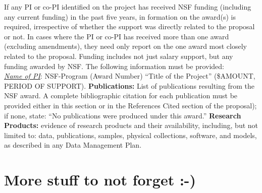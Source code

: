 If any PI or co-PI identified on the project has received NSF funding (including any current
funding) in the past five years, in formation on the award(s) is required,
irrespective of whether the support was directly related to the proposal or not.
In cases where the PI or co-PI has received more than one award (excluding amendments),
they need only report on the one award most closely related to the proposal. Funding includes not just salary
support, but any funding awarded by NSF. The following information must be provided:\\

\noindent
\emph{\underline{Name of PI}}: NSF-Program (Award Number) ``Title of the Project'' (\$AMOUNT, PERIOD OF SUPPORT).
{\bf Publications:} List of publications resulting from the NSF award. A complete bibliographic citation for each
publication must be provided either in this section or in the References Cited section of the proposal); if
none, state: ``No publications were produced under this award.'' {\bf Research Products:} evidence of research products
and their availability, including, but not limited to: data, publications, samples, physical collections, software,
and models, as described in any Data Management Plan.

%

\iflater
\section*{More stuff to not forget :-)}

